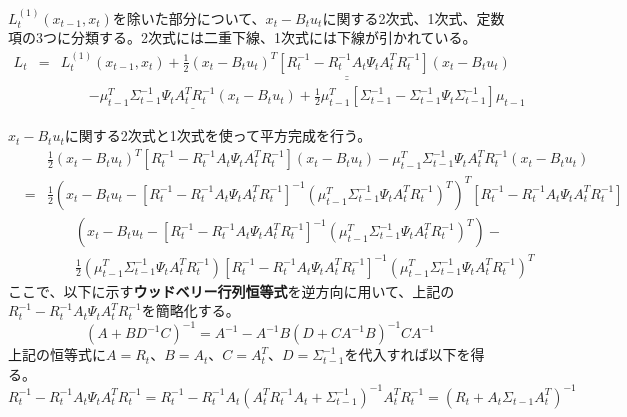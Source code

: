 \documentclass[dvipdfmx,a4paper]{jsarticle}
\begin{document}
$L_t^{(1)}(x_{t - 1}, x_t)$を除いた部分について、$x_t - B_t u_t$に関する2次式、1次式、定数項の3つに分類する。2次式には二重下線、1次式には下線が引かれている。
\begin{eqnarray}
	L_t &=& L_t^{(1)}(x_{t - 1}, x_t) + \underline{\underline{\frac{1}{2} \left( x_t - B_t u_t \right)^T \left[ R_t^{-1} - R_t^{-1} A_t \Psi_t A_t^T R_t^{-1} \right] \left( x_t - B_t u_t \right)}} \nonumber \\
	&& \qquad \underline{- \mu_{t - 1}^T \Sigma_{t - 1}^{-1} \Psi_t A_t^T R_t^{-1} \left( x_t - B_t u_t \right)} + \frac{1}{2} \mu_{t - 1}^T \left[ \Sigma_{t - 1}^{-1} - \Sigma_{t - 1}^{-1} \Psi_t \Sigma_{t - 1}^{-1} \right] \mu_{t - 1}
\end{eqnarray}

$x_t - B_t u_t$に関する2次式と1次式を使って平方完成を行う。
\begin{eqnarray}
	&& \frac{1}{2} \left( x_t - B_t u_t \right)^T \left[ R_t^{-1} - R_t^{-1} A_t \Psi_t A_t^T R_t^{-1} \right] \left( x_t - B_t u_t \right) - \mu_{t - 1}^T \Sigma_{t - 1}^{-1} \Psi_t A_t^T R_t^{-1} \left( x_t - B_t u_t \right) \nonumber \\
	&=& \frac{1}{2} \left( x_t - B_t u_t - \left[ R_t^{-1} - R_t^{-1} A_t \Psi_t A_t^T R_t^{-1} \right]^{-1} \left( \mu_{t - 1}^T \Sigma_{t - 1}^{-1} \Psi_t A_t^T R_t^{-1} \right)^T \right)^T \left[ R_t^{-1} - R_t^{-1} A_t \Psi_t A_t^T R_t^{-1} \right] \nonumber \\
	&& \qquad \left( x_t - B_t u_t - \left[ R_t^{-1} - R_t^{-1} A_t \Psi_t A_t^T R_t^{-1} \right]^{-1} \left( \mu_{t - 1}^T \Sigma_{t - 1}^{-1} \Psi_t A_t^T R_t^{-1} \right)^T \right) - \nonumber \\
	&& \qquad \frac{1}{2} \left( \mu_{t - 1}^T \Sigma_{t - 1}^{-1} \Psi_t A_t^T R_t^{-1} \right) \left[ R_t^{-1} - R_t^{-1} A_t \Psi_t A_t^T R_t^{-1} \right]^{-1} \left( \mu_{t - 1}^T \Sigma_{t - 1}^{-1} \Psi_t A_t^T R_t^{-1} \right)^T
\end{eqnarray}
ここで、以下に示す\textbf{ウッドベリー行列恒等式}を逆方向に用いて、上記の$R_t^{-1} - R_t^{-1} A_t \Psi_t A_t^T R_t^{-1}$を簡略化する。
\begin{equation}
	\left( A + B D^{-1} C \right)^{-1} = A^{-1} - A^{-1} B \left( D + C A^{-1} B \right)^{-1} C A^{-1}
\end{equation}
上記の恒等式に$A = R_t$、$B = A_t$、$C = A_t^T$、$D = \Sigma_{t - 1}^{-1}$を代入すれば以下を得る。
\begin{equation}
	R_t^{-1} - R_t^{-1} A_t \Psi_t A_t^T R_t^{-1} = R_t^{-1} - R_t^{-1} A_t \left( A_t^T R_t^{-1} A_t + \Sigma_{t - 1}^{-1} \right)^{-1} A_t^T R_t^{-1} = \left( R_t + A_t \Sigma_{t - 1} A_t^T \right)^{-1}
\end{equation}
\end{document}
